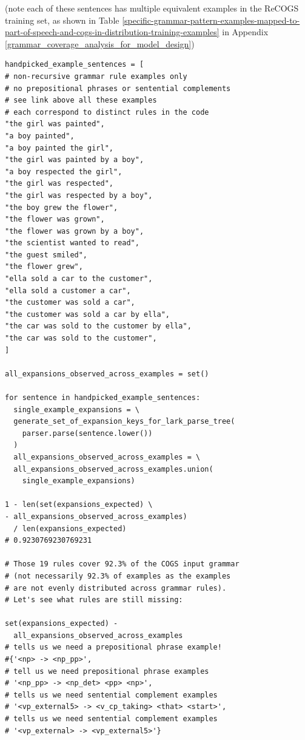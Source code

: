 \documentclass[11pt]{article}
\begin{document}
(note each of these sentences has multiple equivalent examples in the ReCOGS training set, as shown in Table \ref{specific-grammar-pattern-examples-mapped-to-part-of-speech-and-cogs-in-distribution-training-examples} in Appendix \ref{grammar_coverage_analysis_for_model_design})

\begin{tiny}
\begin{verbatim}
handpicked_example_sentences = [ 
# non-recursive grammar rule examples only
# no prepositional phrases or sentential complements
# see link above all these examples 
# each correspond to distinct rules in the code
"the girl was painted",
"a boy painted",
"a boy painted the girl",
"the girl was painted by a boy",
"a boy respected the girl", 
"the girl was respected",
"the girl was respected by a boy",
"the boy grew the flower",
"the flower was grown",
"the flower was grown by a boy",
"the scientist wanted to read",
"the guest smiled",
"the flower grew",
"ella sold a car to the customer",
"ella sold a customer a car",
"the customer was sold a car",
"the customer was sold a car by ella",
"the car was sold to the customer by ella",
"the car was sold to the customer",
]

all_expansions_observed_across_examples = set()

for sentence in handpicked_example_sentences:
  single_example_expansions = \
  generate_set_of_expansion_keys_for_lark_parse_tree(
    parser.parse(sentence.lower())
  )
  all_expansions_observed_across_examples = \
  all_expansions_observed_across_examples.union(
    single_example_expansions)

1 - len(set(expansions_expected) \
- all_expansions_observed_across_examples) 
  / len(expansions_expected)
# 0.9230769230769231

# Those 19 rules cover 92.3% of the COGS input grammar
# (not necessarily 92.3% of examples as the examples 
# are not evenly distributed across grammar rules).
# Let's see what rules are still missing:

set(expansions_expected) - 
  all_expansions_observed_across_examples
# tells us we need a prepositional phrase example!
#{'<np> -> <np_pp>',
# tell us we need prepositional phrase examples
# '<np_pp> -> <np_det> <pp> <np>',
# tells us we need sentential complement examples
# '<vp_external5> -> <v_cp_taking> <that> <start>',
# tells us we need sentential complement examples
# '<vp_external> -> <vp_external5>'}
\end{verbatim}
\end{tiny}
\end{document}
